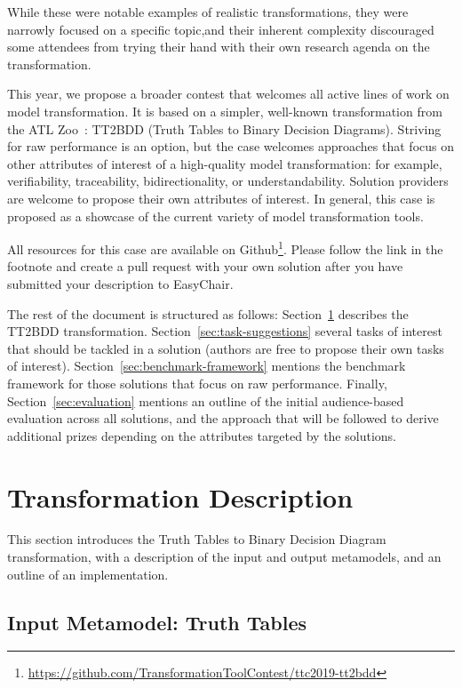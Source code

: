 \documentclass[a4paper]{scrartcl}
\begin{document}
While these were notable examples of realistic transformations, they were
narrowly focused on a specific topic,and their inherent complexity discouraged
some attendees from trying their hand with their own research agenda on the
transformation.

This year, we propose a broader contest that welcomes all active lines of work
on model transformation. It is based on a simpler, well-known transformation
from the ATL Zoo~\cite{atlzoo}: TT2BDD (Truth Tables to Binary Decision
Diagrams). Striving for raw performance is an option, but the case welcomes
approaches that focus on other attributes of interest of a high-quality model
transformation: for example, verifiability, traceability, bidirectionality, or
understandability. Solution providers are welcome to propose their own
attributes of interest. In general, this case is proposed as a showcase of the
current variety of model transformation tools.

All resources for this case are available on
Github\footnote{\url{https://github.com/TransformationToolContest/ttc2019-tt2bdd}}.
Please follow the link in the footnote and create a pull request with your own
solution after you have submitted your description to EasyChair.

The rest of the document is structured as follows:
Section~\ref{sec:transf-descr} describes the TT2BDD transformation.
Section~\ref{sec:task-suggestions} several tasks of interest that
should be tackled in a solution (authors are free to propose their own tasks of
interest). Section~\ref{sec:benchmark-framework} mentions the benchmark
framework for those solutions that focus on raw performance. Finally,
Section~\ref{sec:evaluation} mentions an outline of the initial audience-based
evaluation across all solutions, and the approach that will be followed to
derive additional prizes depending on the attributes targeted by the solutions.

\section{Transformation Description}
\label{sec:transf-descr}

This section introduces the Truth Tables to Binary Decision Diagram
transformation, with a description of the input and output metamodels, and an
outline of an implementation.

\subsection{Input Metamodel: Truth Tables}
\label{sec:input-metam-truth}
\end{document}
